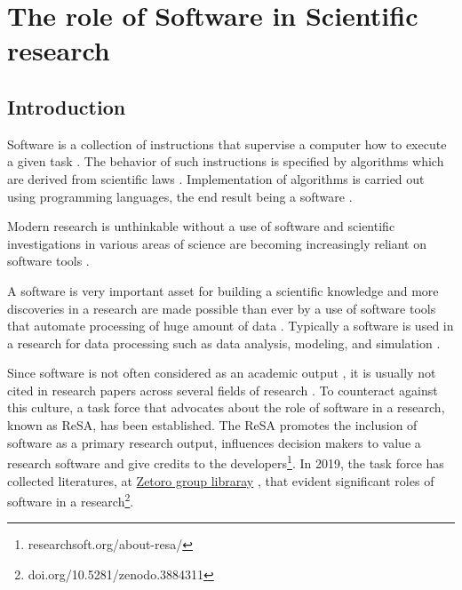 \chapter{The role of Software in Scientific research}
\label{ch:Roles}

%

\section{Introduction}
\label{sec:background:intro}
Software is a collection of instructions that supervise a computer how to execute a given task \citep{enwiki:1056292826}. The behavior of such instructions is specified by algorithms which are derived from scientific laws \citep{wolfram1984computer}.  Implementation of algorithms is carried out using programming languages, the end result being a software \citep{enwiki:1055624679, enwiki:1055665216}. 

Modern research is unthinkable without a use of software and scientific investigations in various areas of science are becoming increasingly reliant on software tools \citep{goble2014better, wilson2014best, storer2017bridging}.

A software is very important asset for building a scientific knowledge and more discoveries in a research are made possible than ever by a use of software tools that automate processing of huge amount of data \citep{jimenez2017four}. Typically a software is used in a research for data processing such as data analysis, modeling, and simulation \cite{hannay2009scientists, pan2016disciplinary}.

Since software is not often considered as an academic output \citep{yang2018important, pan2016disciplinary}, it is usually not cited in research papers across several fields of research  \cite{pan2016disciplinary}. To counteract against this culture, a task force that advocates about the role of software in a research, known as \ac{ReSA}, has been established. The \ac{ReSA} promotes the inclusion of software as a primary research output, influences decision makers to value a research software and give credits to the developers\footnote{researchsoft.org/about-resa/}. In 2019, the task force has collected literatures, at \href{https://www.zotero.org/groups/2400609/resa/library}{Zetoro group libraray} , that evident significant roles of software in a research\footnote{doi.org/10.5281/zenodo.3884311}.  



